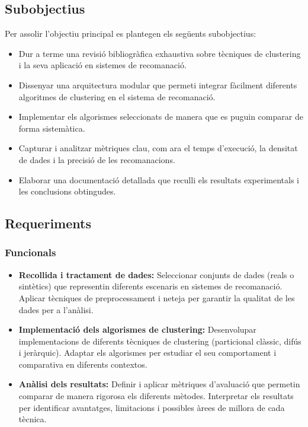 \documentclass[a4paper,12pt]{report}
\begin{document}
\subsection{Subobjectius}

Per assolir l'objectiu principal es plantegen els següents subobjectius: 

\begin{itemize} 
    \item Dur a terme una revisió bibliogràfica exhaustiva sobre tècniques de clustering i la seva aplicació en sistemes de recomanació. 
    \item Dissenyar una arquitectura modular que permeti integrar fàcilment diferents algoritmes de clustering en el sistema de recomanació. 
    \item Implementar els algorismes seleccionats de manera que es puguin comparar de forma sistemàtica. 
    \item Capturar i analitzar mètriques clau, com ara el temps d'execució, la densitat de dades i la precisió de les recomanacions. 
    \item Elaborar una documentació detallada que reculli els resultats experimentals i les conclusions obtingudes. 
\end{itemize}

\subsection{Requeriments}

\subsubsection{Funcionals}

\begin{itemize} 
    \item \textbf{Recollida i tractament de dades:} Seleccionar conjunts de dades (reals o sintètics) que representin diferents escenaris en sistemes de recomanació.
    Aplicar tècniques de preprocessament i neteja per garantir la qualitat de les dades per a l'anàlisi.
    \item \textbf{Implementació dels algorismes de clustering:} Desenvolupar implementacions de diferents tècniques de clustering (particional clàssic, difús i jeràrquic).
    Adaptar els algorismes per estudiar el seu comportament i comparativa en diferents contextos.
    \item \textbf{Anàlisi dels resultats:} Definir i aplicar mètriques d'avaluació que permetin comparar de manera rigorosa els diferents mètodes.
    Interpretar els resultats per identificar avantatges, limitacions i possibles àrees de millora de cada tècnica.
\end{itemize}
\end{document}

